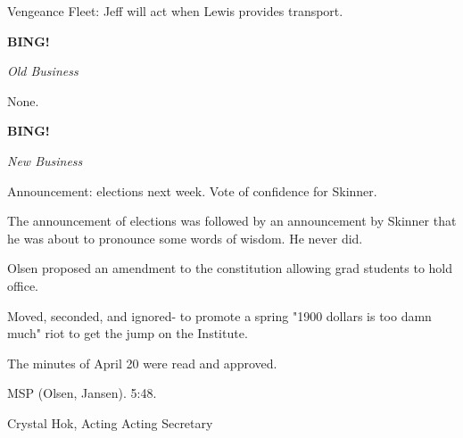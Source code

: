 \documentclass[12pt]{article}
\newcommand{\bing}{{\bf BING!} }
\newcommand{\goto}[1]{\bing \vskip 12pt \centerline{{\em{#1}}}}
\begin{document}
Vengeance Fleet: Jeff will act when Lewis provides transport.

\goto{Old Business}

None.

\goto{New Business}

Announcement: elections next week. Vote of confidence for Skinner.

The announcement of elections was followed by an announcement by Skinner that he was about to pronounce some words of wisdom. He never did.

Olsen proposed an amendment to the constitution allowing grad students to hold office.

Moved, seconded, and ignored- to promote a spring "1900 dollars is too damn much" riot to get the jump on the Institute.

The minutes of April 20 were read and approved.

MSP (Olsen, Jansen). 5:48.

\vspace{12pt}

\centerline{Crystal Hok, Acting Acting Secretary}
\end{document}
